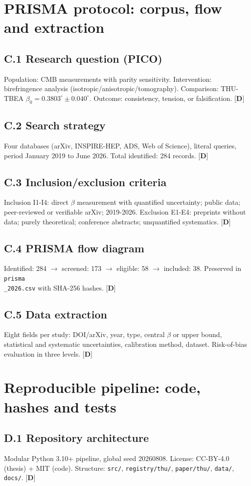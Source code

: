 ﻿\documentclass[11pt,letterpaper]{article}
\begin{document}
\section{PRISMA protocol: corpus, flow and extraction}
\subsection{C.1 Research question (PICO)}
Population: CMB measurements with parity sensitivity. Intervention: birefringence analysis (isotropic/anisotropic/tomography). Comparison: THU-TBEA $\beta_0 = 0{.}3803^\circ \pm 0{.}040^\circ$. Outcome: consistency, tension, or falsification. $\textbf{[D]}$
\subsection{C.2 Search strategy}
Four databases (arXiv, INSPIRE-HEP, ADS, Web of Science), literal queries, period January 2019 to June 2026. Total identified: 284 records. $\textbf{[D]}$
\subsection{C.3 Inclusion/exclusion criteria}
Inclusion I1-I4: direct $\beta$ measurement with quantified uncertainty; public data; peer-reviewed or verifiable arXiv; 2019-2026. Exclusion E1-E4: preprints without data; purely theoretical; conference abstracts; unquantified systematics. $\textbf{[D]}$
\subsection{C.4 PRISMA flow diagram}
Identified: 284 $\to$ screened: 173 $\to$ eligible: 58 $\to$ included: 38. Preserved in \texttt{prisma\\\_2026.csv} with SHA-256 hashes. $\textbf{[D]}$
\subsection{C.5 Data extraction}
Eight fields per study: DOI/arXiv, year, type, central $\beta$ or upper bound, statistical and systematic uncertainties, calibration method, dataset. Risk-of-bias evaluation in three levels. $\textbf{[D]}$
\section{Reproducible pipeline: code, hashes and tests}
\subsection{D.1 Repository architecture}
Modular Python 3.10+ pipeline, global seed 20260808. License: CC-BY-4.0 (thesis) + MIT (code). Structure: \texttt{src/}, \texttt{registry/thu/}, \texttt{paper/thu/}, \texttt{data/}, \texttt{docs/}. $\textbf{[D]}$
\end{document}
